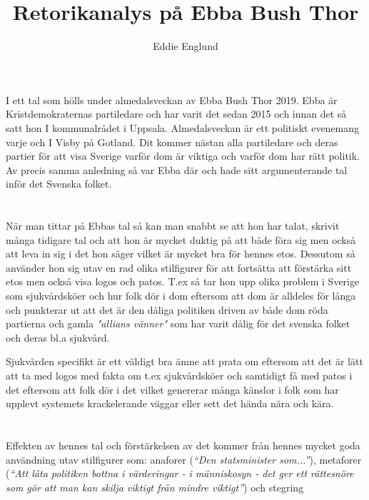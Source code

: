 \documentclass[12pt, letterpaper]{article}
\title{Retorikanalys på Ebba Bush Thor}
\author{Eddie Englund}
\begin{document}
    \maketitle

    \section{}
    I ett tal som hölls under almedalsveckan av Ebba Bush Thor 2019. Ebba är Kristdemokraternas partiledare och har varit det sedan 2015 och innan det så satt hon I kommunalrådet i Uppsala. Almedalsveckan är ett politiskt evenemang varje och I Visby på Gotland. Dit kommer nästan alla partiledare och deras partier för att visa Sverige varför dom är viktiga och varför dom har rätt politik. Av precis samma anledning så var Ebba där och hade sitt argumenterande tal inför det Svenska folket.
    
    \section{}
    När man tittar på Ebbas tal så kan man snabbt se att hon har talat, skrivit många tidigare tal och att hon är mycket duktig på att både föra sig men också att leva in sig i det hon säger vilket är mycket bra för hennes etos. Dessutom så använder hon sig utav en rad olika stilfigurer för att fortsätta att förstärka sitt etos men också visa logos och patos. T.ex så tar hon upp olika problem i Sverige som sjukvårdsköer och hur folk dör i dom eftersom att dom är alldeles för långa och punkterar ut att det är den dåliga politiken driven av både dom röda partierna och gamla \textit{"allians vänner"} som har varit dålig för det svenska folket och deras bl.a sjukvård.

    Sjukvården specifikt är ett väldigt bra ämne att prata om eftersom att det är lätt att ta med logos med fakta om t.ex sjukvårdsköer och samtidigt få med patos i det eftersom att folk dör i det vilket genererar många känslor i folk som har upplevt systemets krackelerande väggar eller sett det hända nära och kära.

    \section{}
    Effekten av hennes tal och förstärkelsen av det kommer från hennes mycket goda användning utav stilfigurer som: anaforer (\textit{``Den statsminister som...''}),  metaforer (\textit{``Att låta politiken bottna i värderingar - i människosyn - det ger ett rättesnöre som gör att man kan skilja viktigt från mindre viktigt''}) och stegring
\end{document}

